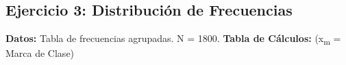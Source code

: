 \documentclass[12pt, a4paper]{article} %
\newcommand{\mean}[1]{\ensuremath{\bar{#1}}} %
\begin{document}
\subsection*{Ejercicio 3: Distribución de Frecuencias}
\textbf{Datos:} Tabla de frecuencias agrupadas. N = \num{1800}.
\textbf{Tabla de Cálculos:} (x\textsubscript{m} = Marca de Clase)

\centering
\end{document}
